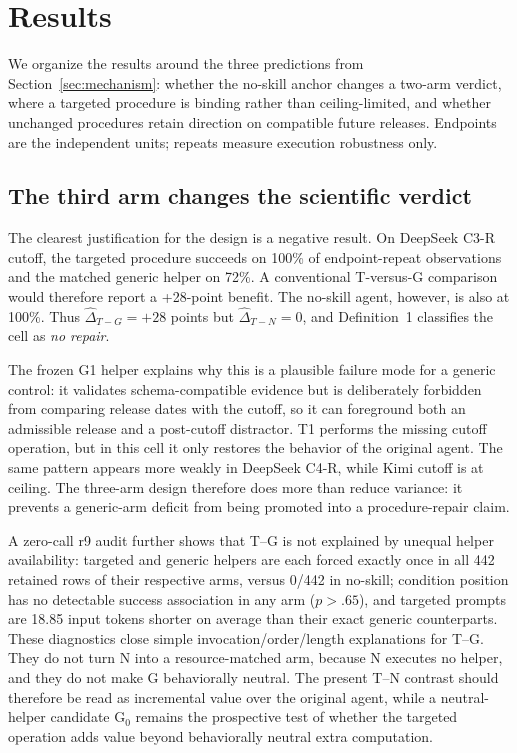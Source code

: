 \section{Results}
\label{sec:results}
We organize the results around the three predictions from Section~\ref{sec:mechanism}: whether the no-skill anchor changes a two-arm verdict, where a targeted procedure is binding rather than ceiling-limited, and whether unchanged procedures retain direction on compatible future releases. Endpoints are the independent units; repeats measure execution robustness only.

\subsection{The third arm changes the scientific verdict}
\label{sec:falsepositive}
The clearest justification for the design is a negative result. On DeepSeek C3-R cutoff, the targeted procedure succeeds on 100\% of endpoint-repeat observations and the matched generic helper on 72\%. A conventional T-versus-G comparison would therefore report a +28-point benefit. The no-skill agent, however, is also at 100\%. Thus $\widehat{\Delta}_{T-G}=+28$ points but $\widehat{\Delta}_{T-N}=0$, and Definition~1 classifies the cell as \emph{no repair}.

The frozen G1 helper explains why this is a plausible failure mode for a generic control: it validates schema-compatible evidence but is deliberately forbidden from comparing release dates with the cutoff, so it can foreground both an admissible release and a post-cutoff distractor. T1 performs the missing cutoff operation, but in this cell it only restores the behavior of the original agent. The same pattern appears more weakly in DeepSeek C4-R, while Kimi cutoff is at ceiling. The three-arm design therefore does more than reduce variance: it prevents a generic-arm deficit from being promoted into a procedure-repair claim.

A zero-call r9 audit further shows that T--G is not explained by unequal helper availability: targeted and generic helpers are each forced exactly once in all 442 retained rows of their respective arms, versus 0/442 in no-skill; condition position has no detectable success association in any arm ($p>.65$), and targeted prompts are 18.85 input tokens shorter on average than their exact generic counterparts. These diagnostics close simple invocation/order/length explanations for T--G. They do not turn N into a resource-matched arm, because N executes no helper, and they do not make G behaviorally neutral. The present T--N contrast should therefore be read as incremental value over the original agent, while a neutral-helper candidate G$_0$ remains the prospective test of whether the targeted operation adds value beyond behaviorally neutral extra computation.

